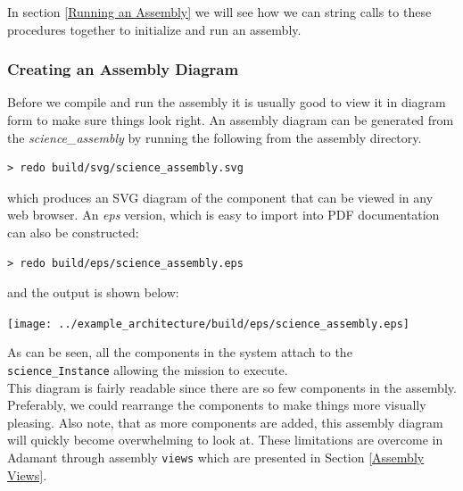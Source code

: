In section \ref{Running an Assembly} we will see how we can string calls to these procedures together to initialize and run an assembly.

\subsubsection{Creating an Assembly Diagram} \label{Creating an Assembly Diagram}

Before we compile and run the assembly it is usually good to view it in diagram form to make sure things look right. An assembly diagram can be generated from the \textit{science\_assembly} by running the following from the assembly directory.

\vspace{5mm} %
\begin{verbatim}
> redo build/svg/science_assembly.svg
\end{verbatim}
\vspace{5mm} %

which produces an SVG diagram of the component that can be viewed in any web browser. An \textit{eps} version, which is easy to import into PDF documentation can also be constructed:

\vspace{5mm} %
\begin{verbatim}
> redo build/eps/science_assembly.eps
\end{verbatim}
\vspace{5mm} %

and the output is shown below:

\vspace{5mm} %
\texttt{[image: ../example\_architecture/build/eps/science\_assembly.eps]}
\vspace{5mm} %

As can be seen, all the components in the system attach to the \texttt{science\_Instance} allowing the mission to execute. \\

This diagram is fairly readable since there are so few components in the assembly. Preferably, we could rearrange the components to make things more visually pleasing. Also note, that as more components are added, this assembly diagram will quickly become overwhelming to look at. These limitations are overcome in Adamant through assembly \texttt{views} which are presented in Section \ref{Assembly Views}.

